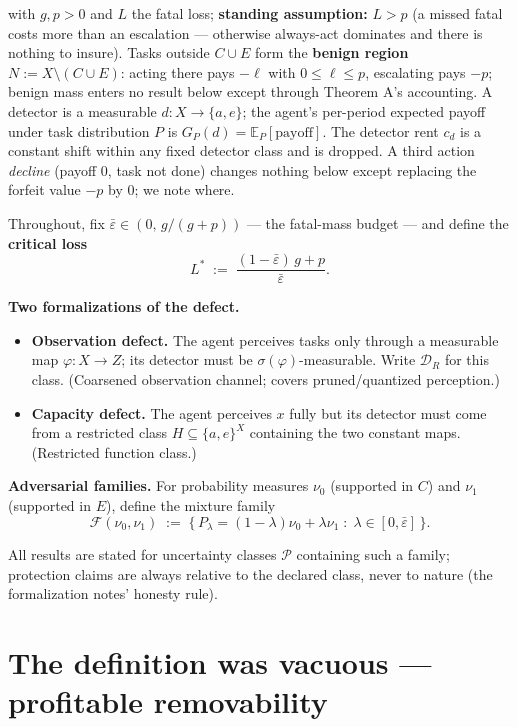\documentclass[11pt]{article}
\theoremstyle{plain}
\theoremstyle{definition}
\begin{document}
\noindent
with $g, p > 0$ and $L$ the fatal loss; \textbf{standing assumption:} $L > p$
(a missed fatal costs more than an escalation --- otherwise always-act
dominates and there is nothing to insure). Tasks outside $C \cup E$ form the
\textbf{benign region} $N := X \setminus (C \cup E)$: acting there pays $-\ell$
with $0 \leq \ell \leq p$, escalating pays $-p$; benign mass enters no result
below except through Theorem A's accounting. A detector is a measurable
$d : X \to \{a, e\}$; the agent's per-period expected payoff under task
distribution $P$ is $G_P(d) = \mathbb{E}_P[\text{payoff}]$. The detector rent
$c_d$ is a constant shift within any fixed detector class and is dropped. A
third action \emph{decline} (payoff $0$, task not done) changes nothing below
except replacing the forfeit value $-p$ by $0$; we note where.

Throughout, fix $\bar\varepsilon \in (0,\, g/(g+p))$ --- the fatal-mass budget ---
and define the \textbf{critical loss}
$$L^* \;:=\; \frac{(1-\bar\varepsilon)\,g + p}{\bar\varepsilon}.$$

\textbf{Two formalizations of the defect.}
\begin{itemize}
\item \textbf{Observation defect.} The agent perceives tasks only through a measurable
  map $\varphi : X \to Z$; its detector must be $\sigma(\varphi)$-measurable.
  Write $\mathcal{D}_R$ for this class. (Coarsened observation channel;
  covers pruned/quantized perception.)
\item \textbf{Capacity defect.} The agent perceives $x$ fully but its detector must
  come from a restricted class $H \subseteq \{a,e\}^X$ containing the two
  constant maps. (Restricted function class.)
\end{itemize}

\textbf{Adversarial families.} For probability measures $\nu_0$ (supported in $C$)
and $\nu_1$ (supported in $E$), define the mixture family
$$\mathcal{F}(\nu_0, \nu_1) \;:=\; \{\, P_\lambda = (1-\lambda)\nu_0 + \lambda \nu_1 \;:\; \lambda \in [0, \bar\varepsilon] \,\}.$$

All results are stated for uncertainty classes $\mathcal{P}$ containing such a
family; protection claims are always relative to the declared class, never to
nature (the formalization notes' honesty rule).

\section{The definition was vacuous --- profitable removability}\label{app:vacuous}
\end{document}
